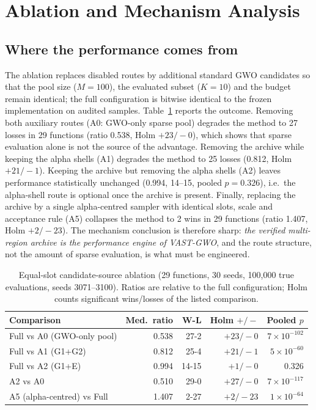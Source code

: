 \documentclass[journal]{IEEEtran}
\newcommand{\method}{VAST-GWO}
\begin{document}
\section{Ablation and Mechanism Analysis}
\subsection{Where the performance comes from}
The ablation replaces disabled routes by additional standard GWO candidates
so that the pool size ($M=100$), the evaluated subset ($K=10$) and the
budget remain identical; the full configuration is bitwise identical to the
frozen implementation on audited samples. Table~\ref{tab:ablation} reports
the outcome. Removing both auxiliary routes (A0: GWO-only sparse pool)
degrades the method to 27 losses in 29 functions (ratio 0.538, Holm
$+23/-0$), which shows that sparse evaluation alone is not the source of the
advantage. Removing the archive while keeping the alpha shells (A1) degrades
the method to 25 losses (0.812, Holm $+21/-1$). Keeping the archive but
removing the alpha shells (A2) leaves performance statistically unchanged
(0.994, 14--15, pooled $p=0.326$), i.e.\ the alpha-shell route is optional
once the archive is present. Finally, replacing the archive by a single
alpha-centred sampler with identical slots, scale and acceptance rule (A5)
collapses the method to 2 wins in 29 functions (ratio 1.407, Holm
$+2/-23$). The mechanism conclusion is therefore sharp: \emph{the verified
multi-region archive is the performance engine of \method{}}, and the route
structure, not the amount of sparse evaluation, is what must be engineered.

\begin{table}[t]
\centering
\small
\caption{Equal-slot candidate-source ablation (29 functions, 30 seeds,
100{,}000 true evaluations, seeds 3071--3100). Ratios are relative to the
full configuration; Holm counts significant wins/losses of the listed
comparison.}
\label{tab:ablation}
\begin{tabular}{lrrrr}
\toprule
Comparison & Med.\ ratio & W-L & Holm $+/-$ & Pooled $p$\\
\midrule
Full vs A0 (GWO-only pool) & 0.538 & 27-2 & $+23/-0$ & $7\times10^{-102}$\\
Full vs A1 (G1+G2) & 0.812 & 25-4 & $+21/-1$ & $5\times10^{-60}$\\
Full vs A2 (G1+E) & 0.994 & 14-15 & $+1/-0$ & 0.326\\
A2 vs A0 & 0.510 & 29-0 & $+27/-0$ & $7\times10^{-117}$\\
A5 (alpha-centred) vs Full & 1.407 & 2-27 & $+2/-23$ & $1\times10^{-64}$\\
\bottomrule
\end{tabular}
\end{table}
\end{document}

